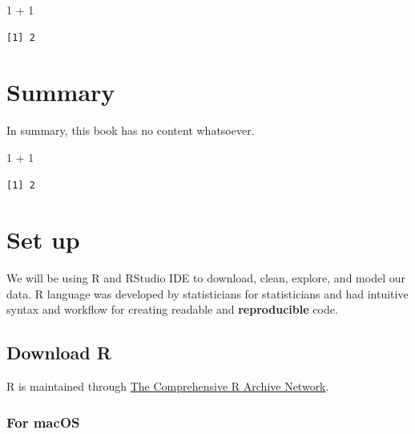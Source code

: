 \documentclass[
  letterpaper,
]{book}
\newenvironment{Shaded}{\begin{snugshade}}{\end{snugshade}}
\newcommand{\DecValTok}[1]{\textcolor[rgb]{0.68,0.00,0.00}{#1}}
\newcommand{\SpecialCharTok}[1]{\textcolor[rgb]{0.37,0.37,0.37}{#1}}
\begin{document}
\begin{Shaded}
\begin{Highlighting}[]
\DecValTok{1} \SpecialCharTok{+} \DecValTok{1}
\end{Highlighting}
\end{Shaded}

\begin{verbatim}
[1] 2
\end{verbatim}


\hypertarget{summary}{%
\chapter{Summary}\label{summary}}

In summary, this book has no content whatsoever.

\begin{Shaded}
\begin{Highlighting}[]
\DecValTok{1} \SpecialCharTok{+} \DecValTok{1}
\end{Highlighting}
\end{Shaded}

\begin{verbatim}
[1] 2
\end{verbatim}


\hypertarget{set-up}{%
\chapter{Set up}\label{set-up}}

We will be using R and RStudio IDE to download, clean, explore, and
model our data. R language was developed by statisticians for
statisticians and had intuitive syntax and workflow for creating
readable and \textbf{reproducible} code.

\hypertarget{download-r}{%
\section{Download R}\label{download-r}}

R is maintained through \href{https://cran.r-project.org/}{The
Comprehensive R Archive Network}.

\hypertarget{for-macos}{%
\subsection{For macOS}\label{for-macos}}
\end{document}

